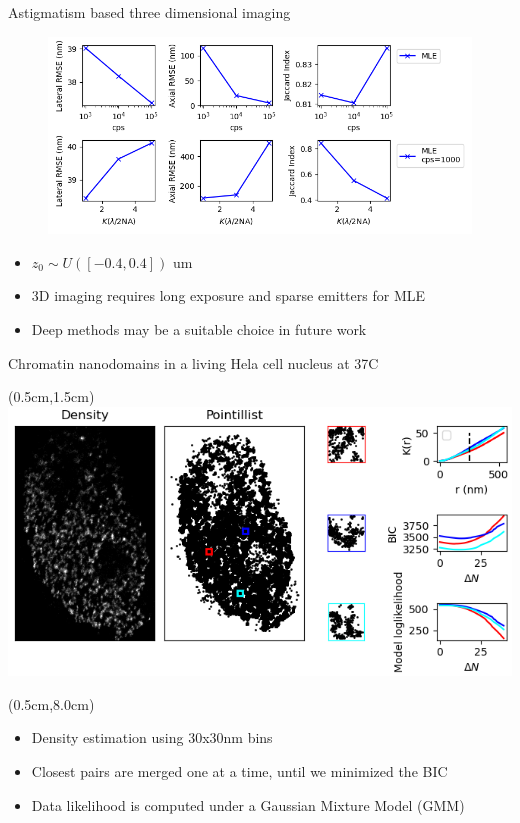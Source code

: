 \documentclass{beamer}					%
\begin{document}
\begin{frame}{Astigmatism based three dimensional imaging}
\begin{figure}
\includegraphics[width=13cm]{PSF3D.png}
\end{figure}
\begin{itemize}
\item $z_{0}\sim U([-0.4,0.4])$ um
\item 3D imaging requires long exposure and sparse emitters for MLE
\item Deep methods may be a suitable choice in future work
\end{itemize}
\end{frame}


\begin{frame}{Chromatin nanodomains in a living Hela cell nucleus at 37C}

\begin{textblock*}{13cm}(0.5cm,1.5cm)
\includegraphics[width=\textwidth]{Cluster.png}
\end{textblock*}

\begin{textblock*}{13cm}(0.5cm,8.0cm)
\begin{itemize}
\item Density estimation using 30x30nm bins
\item Closest pairs are merged one at a time, until we minimized the BIC
\item Data likelihood is computed under a Gaussian Mixture Model (GMM)
\end{itemize}
\end{textblock*}

\end{frame}
\end{document}
